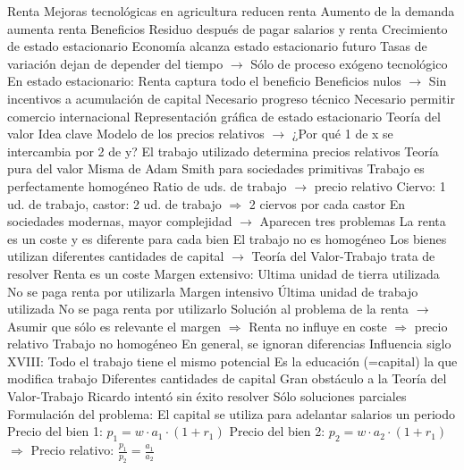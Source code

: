 \documentclass{nuevotema}
\begin{document}
\begin{esquemal}
				\4 Renta
				\4[] Mejoras tecnológicas en agricultura reducen renta
				\4[] Aumento de la demanda aumenta renta
				\4 Beneficios
				\4[] Residuo después de pagar salarios y renta
			\3 Crecimiento de estado estacionario
				\4 Economía alcanza estado estacionario futuro
				\4[] Tasas de variación dejan de depender del tiempo
				\4[] $\to$ Sólo de proceso exógeno tecnológico
				\4 En estado estacionario:
				\4[] Renta captura todo el beneficio
				\4 Beneficios nulos
				\4[] $\to$ Sin incentivos a acumulación de capital
				\4[$\Rightarrow$] Necesario progreso técnico
				\4[$\Rightarrow$] Necesario permitir comercio internacional
				\4 Representación gráfica de estado estacionario
				\4[] 
		\2 Teoría del valor
			\3 Idea clave
				\4 Modelo de los precios relativos
				\4[] $\to$ ¿Por qué 1 de x se intercambia por 2 de y?
				\4[$\Rightarrow$] El trabajo utilizado determina precios relativos
			\3 Teoría pura del valor
				\4 Misma de Adam Smith para sociedades primitivas
				\4 Trabajo es perfectamente homogéneo
				\4 Ratio de uds. de trabajo $\to$ precio relativo
				\4[] Ciervo: 1 ud. de trabajo, castor: 2 ud. de trabajo
				\4[] $\Rightarrow$ 2 ciervos por cada castor
				\4 En sociedades modernas, mayor complejidad
				\4[] $\to$ Aparecen tres problemas
				\4[1] La renta es un coste y es diferente para cada bien
				\4[2] El trabajo no es homogéneo
				\4[3] Los bienes utilizan diferentes cantidades de capital
				\4[] $\to$ Teoría del Valor-Trabajo trata de resolver
			\3[1] Renta es un coste
				\4 Margen extensivo:
				\4[] Ultima unidad de tierra utilizada
				\4[] No se paga renta por utilizarla
				\4 Margen intensivo
				\4[] Última unidad de trabajo utilizada
				\4[] No se paga renta por utilizarlo
				\4 Solución al problema de la renta
				\4[] $\to$ Asumir que sólo es relevante el margen
				\4[] $\Rightarrow$ Renta no influye en coste $\Rightarrow$ precio relativo
			\3[2] Trabajo no homogéneo
				\4 En general, se ignoran diferencias
				\4 Influencia siglo XVIII:
				\4[] Todo el trabajo tiene el mismo potencial
				\4[] Es la educación (=capital) la que modifica trabajo
			\3[3] Diferentes cantidades de capital
				\4 Gran obstáculo a la Teoría del Valor-Trabajo
				\4[] Ricardo intentó sin éxito resolver
				\4[] Sólo soluciones parciales
				\4 Formulación del problema:
				\4[] El capital se utiliza para adelantar salarios un periodo
				\4[] Precio del bien 1: $p_1 = w\cdot a_1 \cdot (1+r_1)$
				\4[] Precio del bien 2: $p_2 = w\cdot a_2 \cdot (1+r_1)$
				\4[] $\Rightarrow$ Precio relativo: $\frac{p_1}{p_2} = \frac{a_1}{a_2}$

\end{esquemal}
\end{document}
